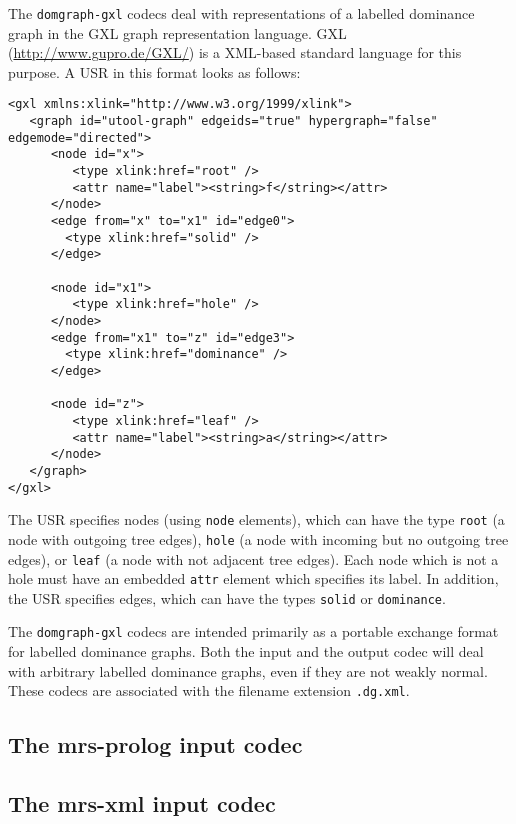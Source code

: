 The \verb?domgraph-gxl? codecs deal with representations of a labelled
dominance graph in the GXL graph representation language. GXL
(\url{http://www.gupro.de/GXL/}) is a XML-based standard language for
this purpose. A USR in this format looks as follows:

\begin{verbatim}
<gxl xmlns:xlink="http://www.w3.org/1999/xlink">
   <graph id="utool-graph" edgeids="true" hypergraph="false" edgemode="directed">
      <node id="x">
         <type xlink:href="root" />
         <attr name="label"><string>f</string></attr>
      </node>
      <edge from="x" to="x1" id="edge0">
        <type xlink:href="solid" />
      </edge>

      <node id="x1">
         <type xlink:href="hole" />
      </node>
      <edge from="x1" to="z" id="edge3">
        <type xlink:href="dominance" />
      </edge>

      <node id="z">
         <type xlink:href="leaf" />
         <attr name="label"><string>a</string></attr>
      </node>
   </graph>
</gxl>
\end{verbatim}

The USR specifies nodes (using \verb?node? elements), which can have
the type \verb?root? (a node with outgoing tree edges), \verb?hole? (a
node with incoming but no outgoing tree edges), or \verb?leaf? (a node
with not adjacent tree edges). Each node which is not a hole must have
an embedded \verb?attr? element which specifies its label. In
addition, the USR specifies edges, which can have the types
\verb?solid? or \verb?dominance?.

The \verb?domgraph-gxl? codecs are intended primarily as a portable
exchange format for labelled dominance graphs. Both the input and the
output codec will deal with arbitrary labelled dominance graphs, even
if they are not weakly normal. These codecs are associated with the
filename extension \verb?.dg.xml?.



\subsection{The mrs-prolog input codec}

\cite{mrs-dom}


\subsection{The mrs-xml input codec}

